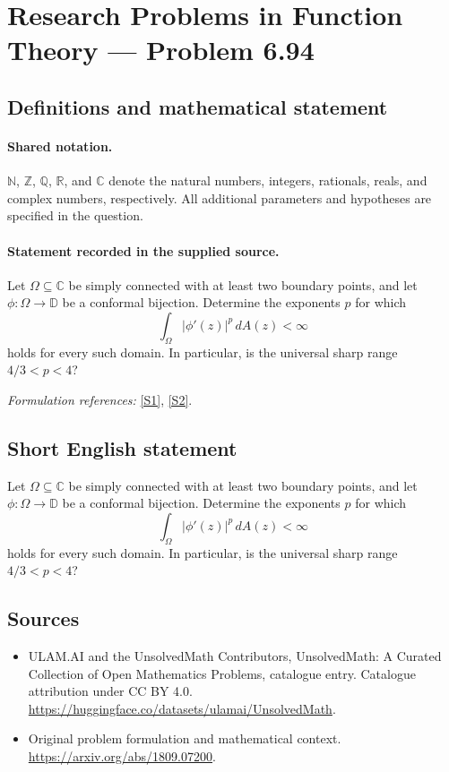 \documentclass[11pt]{article}
\newcommand{\sref}[2]{\hyperlink{source:#1:#2}{[S#2]}}
\begin{document}
\section{Research Problems in Function Theory — Problem 6.94}\label{statement}

\subsection{Definitions and mathematical statement}

\paragraph{Shared notation.}$\mathbb N$, $\mathbb Z$, $\mathbb Q$, $\mathbb R$, and $\mathbb C$ denote the natural numbers, integers, rationals, reals, and complex numbers, respectively. All additional parameters and hypotheses are specified in the question.


\paragraph{Statement recorded in the supplied source.}
Let $\Omega\subseteq\mathbb C$ be simply connected with at least two boundary points, and let $\phi:\Omega\to\mathbb D$ be a conformal bijection. Determine the exponents $p$ for which
\[\int_\Omega|\phi'(z)|^p\,dA(z)<\infty\]
holds for every such domain. In particular, is the universal sharp range $4/3<p<4$?
\par\smallskip\textit{Formulation references:} \sref{statement}{1}, \sref{statement}{2}.
\subsection{Short English statement}
Let $\Omega\subseteq\mathbb C$ be simply connected with at least two boundary points, and let $\phi:\Omega\to\mathbb D$ be a conformal bijection. Determine the exponents $p$ for which
\[\int_\Omega|\phi'(z)|^p\,dA(z)<\infty\]
holds for every such domain. In particular, is the universal sharp range $4/3<p<4$?
\subsection{Sources}
\begin{itemize}
\item[\hypertarget{source:statement:1}{S1}] ULAM.AI and the UnsolvedMath Contributors, UnsolvedMath: A Curated Collection of Open Mathematics Problems, catalogue entry. Catalogue attribution under CC BY 4.0.
\url{https://huggingface.co/datasets/ulamai/UnsolvedMath}.
\item[\hypertarget{source:statement:2}{S2}] Original problem formulation and mathematical context.
\url{https://arxiv.org/abs/1809.07200}.
\end{itemize}
\label{end:statement}
\end{document}

